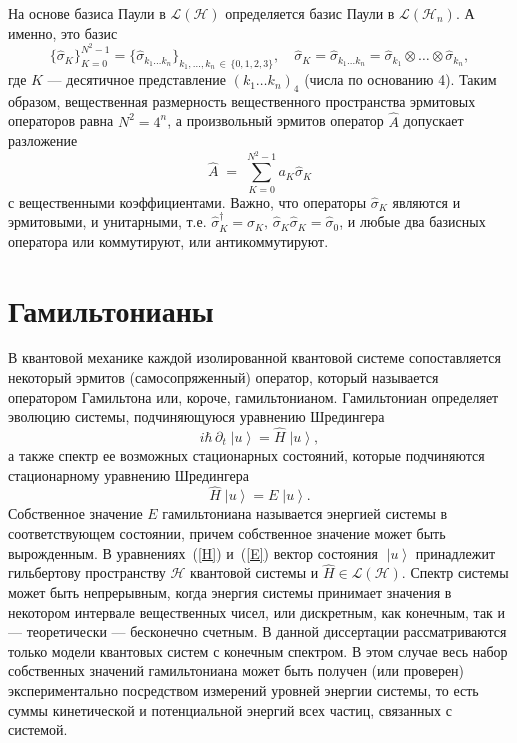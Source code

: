 \documentclass[a4paper]{report}
\newcommand{\ket}[1] {\!\!\;\ensuremath{\left|#1\right\rangle}}
\begin{document}
На основе базиса Паули в ${\mathcal{L}(\mathcal{H})}$ определяется базис Паули в ${\mathcal{L}(\mathcal{H}_n)}$. А именно, это базис
\begin{equation}\label{basis}
\big\{\hat{\sigma}_{K}\big\}_{K=0}^{N^2-1}= \big\{\hat{\sigma}_{k_1\ldots{}k_n} \big\}_{k_1,\ldots,k_n\,\in\, \{0,1,2,3\}},
\quad
\hat{\sigma}_{K}\!=\! \hat{\sigma}_{k_1\ldots{}k_n}=\!\! \hat{\sigma}_{k_1}\!\!\otimes\ldots\otimes\!\hat{\sigma}_{k_n},
\nonumber
\end{equation}
где $K$ --- десятичное представление $(k_1\ldots k_n)_4$ (числа по основанию 4).
Таким образом, вещественная размерность вещественного пространства эрмитовых операторов равна $N^2=4^n$, а произвольный эрмитов оператор $\hat{A}$ допускает разложение
\begin{equation}\label{}
\hat{A}\;=\; \sum\limits_{K=0}^{N^2-1}a_K\hat{\sigma}_{K}
\nonumber
\end{equation}
с вещественными коэффициентами. Важно, что операторы $\hat{\sigma}_{K}$ являются и эрмитовыми, и унитарными, т.е. ${\hat{\sigma}_{K}^\dag=\hat{\sigma}_{K},\, \hat{\sigma}_{K}\hat{\sigma}_{K}=\hat{\sigma}_{0}}$, и любые два базисных оператора или коммутируют, или антикоммутируют.

\section{Гамильтонианы}

В квантовой механике каждой изолированной квантовой системе сопоставляется некоторый эрмитов (самосопряженный) оператор, который  называется оператором Гамильтона или, короче, гамильтонианом. Гамильтониан определяет эволюцию системы, подчиняющуюся уравнению Шредингера
\begin{equation}\label{H}
i\hbar\,\partial_t\ket{u}= \hat{H}\ket{u},
\end{equation}
а также спектр ее возможных стационарных состояний, которые подчиняются стационарному уравнению Шредингера
\begin{equation}\label{E}
\hat{H}\ket{u}= E\ket{u}.
\end{equation}
Собственное значение $E$ гамильтониана называется энергией системы в соответствующем состоянии, причем собственное значение может быть вырожденным. В уравнениях~(\ref{H})  и~(\ref{E}) вектор состояния $\ket{u}$ принадлежит гильбертову пространству ${\mathcal{H}}$ квантовой системы и ${\hat{H}\in\mathcal{L}(\mathcal{H})}$. Спектр системы может быть непрерывным, когда энергия системы принимает значения в некотором интервале вещественных чисел, или дискретным, как конечным, так и --- теоретически --- бесконечно счетным. В данной диссертации рассматриваются только модели квантовых систем с конечным спектром. В этом случае весь набор собственных значений гамильтониана может быть получен (или проверен) экспериментально посредством измерений уровней энергии системы, то есть суммы кинетической и потенциальной энергий всех частиц, связанных с системой. 
\end{document}
